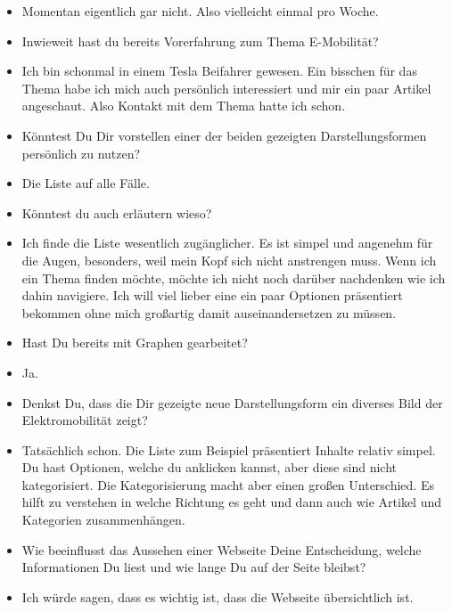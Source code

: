 {\begin{itemize}[]
            \item {} Momentan eigentlich gar nicht. Also vielleicht einmal pro Woche.
            \item {} Inwieweit hast du bereits Vorerfahrung zum Thema E-Mobilität?
            \item {} Ich bin schonmal in einem Tesla Beifahrer gewesen.
                  Ein bisschen für das Thema habe ich mich auch persönlich interessiert und mir ein paar Artikel angeschaut.
                  Also Kontakt mit dem Thema hatte ich schon.
            \item {} Könntest Du Dir vorstellen einer der beiden gezeigten Darstellungsformen persönlich zu nutzen?
            \item {} Die Liste auf alle Fälle.
            \item {} Könntest du auch erläutern wieso?
            \item {} Ich finde die Liste wesentlich zugänglicher.
                  Es ist simpel und angenehm für die Augen, besonders, weil mein Kopf sich nicht anstrengen muss.
                  Wenn ich ein Thema finden möchte, möchte ich nicht noch darüber nachdenken wie ich dahin navigiere.
                  Ich will viel lieber eine ein paar Optionen präsentiert bekommen ohne mich großartig damit auseinandersetzen zu müssen.
            \item {} Hast Du bereits mit Graphen gearbeitet?
            \item {} Ja.
            \item {} Denkst Du, dass die Dir gezeigte neue Darstellungsform ein diverses Bild der Elektromobilität zeigt?
            \item {} Tatsächlich schon. Die Liste zum Beispiel präsentiert Inhalte relativ simpel.
                  Du hast Optionen, welche du anklicken kannst, aber diese sind nicht kategorisiert.
                  Die Kategorisierung macht aber einen großen Unterschied.
                  Es hilft zu verstehen in welche Richtung es geht und dann auch wie Artikel und Kategorien zusammenhängen.
            \item {} Wie beeinflusst das Aussehen einer Webseite Deine Entscheidung, welche Informationen Du liest und wie lange Du auf der Seite bleibst?
            \item {} Ich würde sagen, dass es wichtig ist, dass die Webseite übersichtlich ist.

\end{itemize}}
